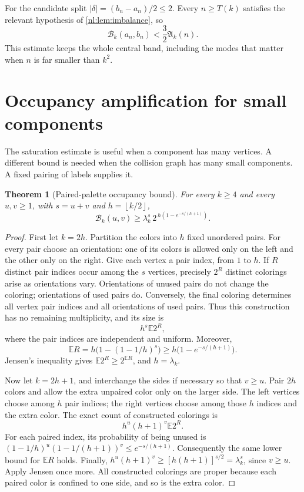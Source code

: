 \documentclass[11pt,a4paper]{article}
\numberwithin{equation}{section}
\newtheorem{theorem}{Theorem}[section]
\theoremstyle{definition}
\theoremstyle{remark}
\newcommand{\Bip}{\mathcal B}
\newcommand{\nlenv}{\mathfrak A}
\newcommand{\nlfloor}[1]{\left\lfloor #1\right\rfloor}
\begin{document}
For the candidate split $|\delta|=(b_n-a_n)/2\le2$. Every $n\ge T(k)$
satisfies the relevant hypothesis of \cref{nl:lem:imbalance}, so
\begin{equation}\label{nl:eq:candidateupper}
 \Bip_k(a_n,b_n)<\frac32\nlenv_k(n).
\end{equation}
This estimate keeps the whole central band, including the modes that
matter when $n$ is far smaller than $k^2$.

\section{Occupancy amplification for small components}\label{nl:sec:occupancy}

The saturation estimate is useful when a component has many vertices.
A different bound is needed when the collision graph has many small
components. A fixed pairing of labels supplies it.

\begin{theorem}[Paired-palette occupancy bound]\label{nl:thm:occupancy}
For every $k\ge4$ and every $u,v\ge1$, with $s=u+v$ and
$h=\nlfloor{k/2}$,
\begin{equation}\label{nl:eq:occupancy}
 \boxed{\Bip_k(u,v)\ge
 \lambda_k^s\,2^{\,h(1-e^{-s/(h+1)})}.}
\end{equation}
\end{theorem}
\begin{proof}
First let $k=2h$. Partition the colors into $h$ fixed unordered pairs.
For every pair choose an orientation: one of its colors is allowed only
on the left and the other only on the right. Give each vertex a pair
index, from $1$ to $h$. If $R$ distinct pair indices occur among the $s$
vertices, precisely $2^R$ distinct colorings arise as orientations vary.
Orientations of unused pairs do not change the coloring; orientations of
used pairs do. Conversely, the final coloring determines all vertex
pair indices and all orientations of used pairs. Thus this construction
has no remaining multiplicity, and its size is
\[
 h^s\mathbb E 2^R,
\]
where the pair indices are independent and uniform. Moreover,
\[
 \mathbb E R=h\bigl(1-(1-1/h)^s\bigr)
 \ge h\bigl(1-e^{-s/(h+1)}\bigr).
\]
Jensen's inequality gives $\mathbb E2^R\ge2^{\mathbb E R}$, and $h=\lambda_k$.

Now let $k=2h+1$, and interchange the sides if necessary so that $v\ge u$.
Pair $2h$ colors and allow the extra unpaired color only on the larger
side. The left vertices choose among $h$ pair indices; the right vertices
choose among those $h$ indices and the extra color. The exact count of
constructed colorings is
\[
 h^u(h+1)^v\mathbb E 2^R.
\]
For each paired index, its probability of being unused is
$(1-1/h)^u(1-1/(h+1))^v\le e^{-s/(h+1)}$.
Consequently the same lower bound for $\mathbb E R$ holds. Finally,
$h^u(h+1)^v\ge[h(h+1)]^{s/2}=\lambda_k^s$, since $v\ge u$.
Apply Jensen once more. All constructed colorings are proper because
each paired color is confined to one side, and so is the extra color.
\end{proof}
\end{document}
